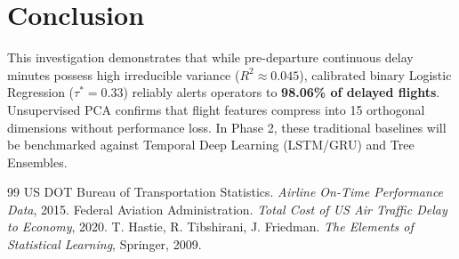 \documentclass[11pt,a4paper]{article}
\begin{document}
\section{Conclusion}

This investigation demonstrates that while pre-departure continuous delay minutes possess high irreducible variance ($R^2 \approx 0.045$), calibrated binary Logistic Regression ($\tau^* = 0.33$) reliably alerts operators to \textbf{98.06\% of delayed flights}. Unsupervised PCA confirms that flight features compress into 15 orthogonal dimensions without performance loss. In Phase 2, these traditional baselines will be benchmarked against Temporal Deep Learning (LSTM/GRU) and Tree Ensembles.

\begin{thebibliography}{99}
 US DOT Bureau of Transportation Statistics. \textit{Airline On-Time Performance Data}, 2015.
 Federal Aviation Administration. \textit{Total Cost of US Air Traffic Delay to Economy}, 2020.
 T. Hastie, R. Tibshirani, J. Friedman. \textit{The Elements of Statistical Learning}, Springer, 2009.
\end{thebibliography}
\end{document}

